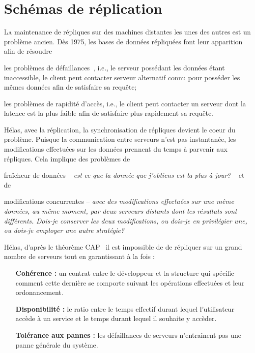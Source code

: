 
\chapter{Schémas de réplication}
\label{repl:chap:replication}

\minitoc

\lettrine{L}a maintenance de répliques sur des machines distantes les unes des
autres est un problème ancien. Dès 1975, les bases de données répliquées font
leur apparition~\cite{johnson1975maintenance} afin de résoudre
\begin{inparaenum}[(i)]
\item les problèmes de défaillances~\cite{alsberg1976principle}, i.e., le
  serveur possédant les données étant inaccessible, le client peut contacter
  serveur alternatif connu pour posséder les mêmes données afin de satisfaire sa
  requête;
\item les problèmes de rapidité d'accès, i.e., le client peut contacter un
  serveur dont la latence est la plus faible afin de satisfaire plus rapidement
  sa requête.
\end{inparaenum}

Hélas, avec la réplication, la synchronisation de répliques devient le coeur du
problème. Puisque la communication entre serveurs n'est pas instantanée, les
modifications effectuées sur les données prennent du temps à parvenir aux
répliques. Cela implique des problèmes de
\begin{inparaenum}[(i)]
\item fraîcheur de données -- \emph{est-ce que la donnée que j'obtiens est la
    plus à jour?} -- et de
\item modifications concurrentes -- \emph{avec des modifications effectuées sur
    une même données, au même moment, par deux serveurs distants dont les
    résultats sont différents. Dois-je conserver les deux modifications, ou
    dois-je en privilégier une, ou dois-je employer une autre stratégie?}
\end{inparaenum}


Hélas, d'après le théorème CAP~\cite{gilbert2002brewer} il est impossible de de
répliquer sur un grand nombre de serveurs tout en garantissant à la fois :
\begin{itemize}
\item [\textbf{Cohérence :}] un contrat entre le développeur et la structure qui
  spécifie comment cette dernière se comporte suivant les opérations effectuées
  et leur ordonancement.
\item [\textbf{Disponibilité :}] le ratio entre le temps effectif durant lequel
  l'utilisateur accède à un service et le temps durant lequel il souhaite y
  accèder.
\item [\textbf{Tolérance aux pannes :}] les défaillances de serveurs
  n'entrainent pas une panne générale du système.
\end{itemize}

